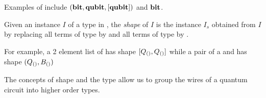 Examples of  include $(\mathbf{{bit}},\mathbf{{qubit}},[\mathbf{{qubit}}])$ and $\mathbf{{bit}}$.

\begin{definition}\label{def:shape}
  Given an instance $I$ of a type  in ,
  the \emph{shape} of $I$ is the instance $I_s$ obtained from
  $I$ by replacing all terms of type \bit by  \Bs and all terms
  of type \qubit by \Qs.
\end{definition}

For example, a 2 element list of \qubits has shape $[Q_{()},Q_{()}]$
while a pair of a \qubit and \bit has shape $(Q_{()},B_{()})$


The concepts of shape and the type  allow us to group
the wires of a quantum circuit into higher
order types.

